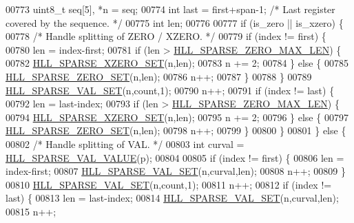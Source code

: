 \begin{DoxyCode}
{{00773     uint8\_t seq[5], *n = seq;
00774     \textcolor{keywordtype}{int} last = first+span-1; \textcolor{comment}{/* Last register covered by the sequence. */}
00775     \textcolor{keywordtype}{int} len;
00776 
00777     \textcolor{keywordflow}{if} (is\_zero || is\_xzero) \{
00778         \textcolor{comment}{/* Handle splitting of ZERO / XZERO. */}
00779         \textcolor{keywordflow}{if} (index != first) \{
00780             len = index-first;
00781             \textcolor{keywordflow}{if} (len > \hyperlink{hyperloglog_8c_ada0fd7046dacafc7e150cf8743b34c62}{HLL\_SPARSE\_ZERO\_MAX\_LEN}) \{
00782                 \hyperlink{hyperloglog_8c_a1e40105f1b438075006c8b38b07f7198}{HLL\_SPARSE\_XZERO\_SET}(n,len);
00783                 n += 2;
00784             \} \textcolor{keywordflow}{else} \{
00785                 \hyperlink{hyperloglog_8c_a587a8a0c93dc2d75f019b49a3f08c14f}{HLL\_SPARSE\_ZERO\_SET}(n,len);
00786                 n++;
00787             \}
00788         \}
00789         \hyperlink{hyperloglog_8c_a27a040f2d48978974a593fdc306241f9}{HLL\_SPARSE\_VAL\_SET}(n,count,1);
00790         n++;
00791         \textcolor{keywordflow}{if} (index != last) \{
00792             len = last-index;
00793             \textcolor{keywordflow}{if} (len > \hyperlink{hyperloglog_8c_ada0fd7046dacafc7e150cf8743b34c62}{HLL\_SPARSE\_ZERO\_MAX\_LEN}) \{
00794                 \hyperlink{hyperloglog_8c_a1e40105f1b438075006c8b38b07f7198}{HLL\_SPARSE\_XZERO\_SET}(n,len);
00795                 n += 2;
00796             \} \textcolor{keywordflow}{else} \{
00797                 \hyperlink{hyperloglog_8c_a587a8a0c93dc2d75f019b49a3f08c14f}{HLL\_SPARSE\_ZERO\_SET}(n,len);
00798                 n++;
00799             \}
00800         \}
00801     \} \textcolor{keywordflow}{else} \{
00802         \textcolor{comment}{/* Handle splitting of VAL. */}
00803         \textcolor{keywordtype}{int} curval = \hyperlink{hyperloglog_8c_ad36de263468a9ce3b1409743b8da64d7}{HLL\_SPARSE\_VAL\_VALUE}(p);
00804 
00805         \textcolor{keywordflow}{if} (index != first) \{
00806             len = index-first;
00807             \hyperlink{hyperloglog_8c_a27a040f2d48978974a593fdc306241f9}{HLL\_SPARSE\_VAL\_SET}(n,curval,len);
00808             n++;
00809         \}
00810         \hyperlink{hyperloglog_8c_a27a040f2d48978974a593fdc306241f9}{HLL\_SPARSE\_VAL\_SET}(n,count,1);
00811         n++;
00812         \textcolor{keywordflow}{if} (index != last) \{
00813             len = last-index;
00814             \hyperlink{hyperloglog_8c_a27a040f2d48978974a593fdc306241f9}{HLL\_SPARSE\_VAL\_SET}(n,curval,len);
00815             n++;
}}
\end{DoxyCode}
